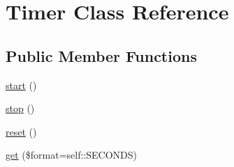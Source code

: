 \hypertarget{class_tools_1_1_timer}{
\section{\-Timer \-Class \-Reference}
\label{class_tools_1_1_timer}
}
\subsection*{\-Public \-Member \-Functions}
\begin{DoxyCompactItemize}
\item 
\hyperlink{class_tools_1_1_timer_af8fa59992209e36dccb3eefb0f75531f}{start} ()
\item 
\hyperlink{class_tools_1_1_timer_a8b6fc76a620d7557d06e9a11a9ffb509}{stop} ()
\item 
\hyperlink{class_tools_1_1_timer_a4a20559544fdf4dcb457e258dc976cf8}{reset} ()
\item 
\hyperlink{class_tools_1_1_timer_aea293d5663ecddbe2cb3e7f6aa6aac37}{get} (\$format=self\-::\-S\-E\-C\-O\-N\-D\-S)
\end{DoxyCompactItemize}
